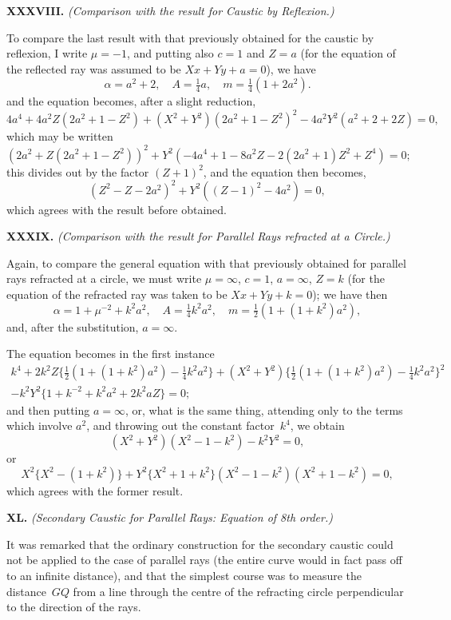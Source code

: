 \documentclass[12pt,a4paper]{article}
\theoremstyle{definition}
\begin{document}
\medskip\noindent\textbf{XXXVIII.}
\textit{(Comparison with the result for Caustic by Reflexion.)}

To compare the last result with that previously obtained for
the caustic by reflexion, I write $\mu = -1$, and putting also
$c = 1$ and $Z = a$ (for the equation of the reflected ray was
assumed to be $Xx + Yy + a = 0$), we have
\[
\alpha = a^{2} + 2, \quad A = \tfrac{1}{4}a, \quad m = \tfrac{1}{4}(1 + 2a^{2}).
\]
and the equation becomes, after a slight reduction,
\[
4a^{4} + 4a^{2}Z(2a^{2} + 1 - Z^{2}) + (X^{2} + Y^{2})(2a^{2} + 1 - Z^{2})^{2}
- 4a^{2}Y^{2}(a^{2} + 2 + 2Z) = 0,
\]
which may be written
\[
(2a^{2} + Z(2a^{2} + 1 - Z^{2}))^{2} + Y^{2}(-4a^{4} + 1 - 8a^{2}Z
- 2(2a^{2} + 1)Z^{2} + Z^{4}) = 0;
\]
this divides out by the factor $(Z + 1)^{2}$, and the equation then becomes,
\[
(Z^{2} - Z - 2a^{2})^{2} + Y^{2}((Z - 1)^{2} - 4a^{2}) = 0,
\]
which agrees with the result before obtained.

\medskip\noindent\textbf{XXXIX.}
\textit{(Comparison with the result for Parallel Rays refracted at a Circle.)}

Again, to compare the general equation with that previously
obtained for parallel rays refracted at a circle, we must write
$\mu = \infty$, $c = 1$, $a = \infty$, $Z = k$ (for the equation of the
refracted ray was taken to be $Xx + Yy + k = 0$); we have then
\[
\alpha = 1 + \mu^{-2} + k^{2}a^{2}, \quad
A = \tfrac{1}{4}k^{2}a^{2}, \quad
m = \tfrac{1}{2}(1 + (1 + k^{2})a^{2}),
\]
and, after the substitution, $a = \infty$.

The equation becomes in the first instance
\begin{multline*}
k^{4} + 2k^{2}Z \{ \tfrac{1}{2}(1 + (1 + k^{2})a^{2}) - \tfrac{1}{4}k^{2}a^{2} \}
+ (X^{2} + Y^{2}) \{ \tfrac{1}{2}(1 + (1 + k^{2})a^{2}) - \tfrac{1}{4}k^{2}a^{2} \}^{2} \\
- k^{2}Y^{2} \{ 1 + k^{-2} + k^{2}a^{2} + 2k^{2}aZ \} = 0;
\end{multline*}
and then putting $a = \infty$, or, what is the same thing, attending
only to the terms which involve $a^{2}$, and throwing out the constant
factor~$k^{4}$, we obtain
\[
(X^{2} + Y^{2})(X^{2} - 1 - k^{2}) - k^{2}Y^{2} = 0,
\]
or
\[
X^{2}\{X^{2} - (1 + k^{2})\} + Y^{2}\{X^{2} + 1 + k^{2}\}
(X^{2} - 1 - k^{2})(X^{2} + 1 - k^{2}) = 0,
\]
which agrees with the former result.

\medskip\noindent\textbf{XL.}
\textit{(Secondary Caustic for Parallel Rays: Equation of 8th order.)}

It was remarked that the ordinary construction for the secondary
caustic could not be applied to the case of parallel rays (the
entire curve would in fact pass off to an infinite distance),
and that the simplest course was to measure the distance~$GQ$
from a line through the centre of the refracting circle perpendicular
to the direction of the rays.
\end{document}
